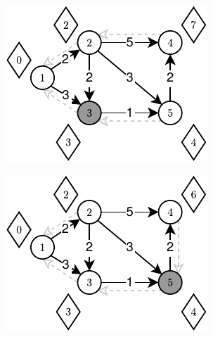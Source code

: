 \begin{figure}[!htbp]
\begin{subfigure}[b]{0.18\textwidth}
		\includegraphics[width=\textwidth]{Chapter_II/TOPOLOGIC-SHORTEST-PATH-Example/c.pdf}
		\caption{}
	\end{subfigure}
	\begin{subfigure}[b]{0.18\textwidth}
		\includegraphics[width=\textwidth]{Chapter_II/TOPOLOGIC-SHORTEST-PATH-Example/d.pdf}
		\caption{}
	\end{subfigure}
	\begin{subfigure}[b]{0.18\textwidth}

\end{subfigure}
\end{figure}
